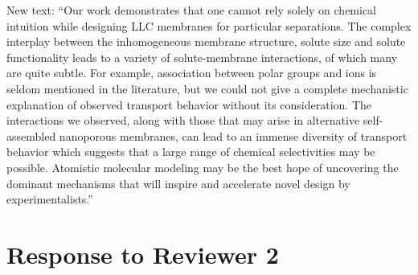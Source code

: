 \documentclass{article}
\begin{document}
\begin{enumerate}
    New text: ``Our work demonstrates that one cannot rely solely on chemical intuition while 
    designing LLC membranes for particular separations. The complex interplay between the
    inhomogeneous membrane structure, solute size and solute functionality leads to a variety of
    solute-membrane interactions, of which many are quite subtle. For example, association
    between polar groups and ions is seldom mentioned in the literature, but we could not give a
    complete mechanistic explanation of observed transport behavior without its consideration. 
    The interactions we observed, along with those that may arise in alternative self-assembled
    nanoporous membranes, can lead to an immense diversity of transport behavior which suggests
    that a large range of chemical selectivities may be possible. Atomistic molecular modeling
    may be the best hope of uncovering the dominant mechanisms that will inspire and accelerate
    novel design by experimentalists.''
	
\end{enumerate}

\section*{Response to Reviewer 2}
\end{document}
